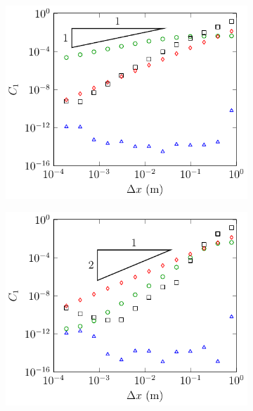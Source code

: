 \begin{figure}
	\centering
	\begin{subfigure}{0.5\textwidth}
		\includegraphics[width=\textwidth]{./chp5/figures/Analytic/Soliton/C1/FDVM1.pdf}
		\vspace{0.3cm}
	\end{subfigure}%
	\begin{subfigure}{0.5\textwidth}
		\includegraphics[width=\textwidth]{./chp5/figures/Analytic/Soliton/C1/FDVM2.pdf}
		\vspace{0.3cm}
	\end{subfigure}

\end{figure}
